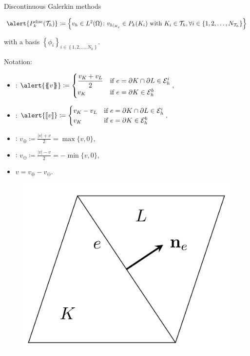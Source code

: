 \begin{frame}{Discontinuous Galerkin methods}
	\footnotesize
	\vspace*{-0.5cm}
	\begin{block}{}
		\begin{center}
			$\alert{\Pd_k(\T_h)}\coloneqq\left\{v_h\in L^2(\Omega)\colon v_{h|_{K_i}}\in\mathbb{P}_k(K_i)\text{ with } K_i\in\T_h,\forall i\in\left\{1,2,\ldots,N_{\T_h}\right\}\right\}$
		\end{center}
	\end{block}
	with a basis $\left\{\phi_i\right\}_{i\in\left\{1,2,\ldots,N_h \right\}}$.
	
	\vspace*{0.3cm}
	Notation:
	
	\begin{minipage}{0.69\textwidth}
	\begin{itemize}
		\item {}: 
		$\alert{\media{v}}\coloneqq
		\begin{cases}
			\dfrac{\vK+\vL}{2}&\text{if } e=\partial K\cap\partial L\in\E_h^i\\
			\vK&\text{if }e=\partial K\in\E_h^b
		\end{cases},$
		\item {}: $
		\alert{\salto{v}}\coloneqq
		\begin{cases}
			\vK-\vL&\text{if } e=\partial K\cap\partial L\in\E_h^i\\
			\vK&\text{if }e=\partial K\in\E_h^b
		\end{cases},$
	\item {}:
		$v_\oplus\coloneqq\displaystyle\frac{\vert v\vert +v}{2}=\max\{v,0\},$
	\item {}:
	$v_{\ominus}\coloneqq\displaystyle\frac{\vert v\vert -v}{2}=-\min\{v,0\},$
	\item $
	v=v_\oplus - v_\ominus.
	$
		\end{itemize}
	\end{minipage}
	\begin{minipage}{0.29\textwidth}
		\begin{figure}
			\centering
			\includegraphics[scale=0.7]{img/figura_tikz.png}

\end{figure}
\end{minipage}
\end{frame}
